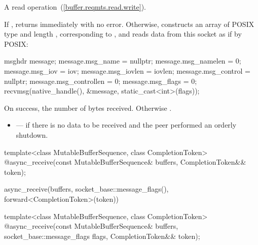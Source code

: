\begin{itemdescr}
\pnum
A read operation~(\ref{buffer.reqmts.read.write}).

\pnum
\effects If , returns immediately with no error. Otherwise, constructs an array  of POSIX type  and length , corresponding to , and reads data from this socket as if by POSIX:
\begin{codeblock}
msghdr message;
message.msg_name = nullptr;
message.msg_namelen = 0;
message.msg_iov = iov;
message.msg_iovlen = iovlen;
message.msg_control = nullptr;
message.msg_controllen = 0;
message.msg_flags = 0;
recvmsg(native_handle(), &message, static_cast<int>(flags));
\end{codeblock}


\pnum
\returns On success, the number of bytes received. Otherwise .

\pnum
\errors
\begin{itemize}
\item
{} --- if there is no data to be received and the peer performed an orderly shutdown.
\end{itemize}
\end{itemdescr}

\begin{itemdecl}
template<class MutableBufferSequence, class CompletionToken>
  @\DEDUCED@ async_receive(const MutableBufferSequence& buffers,
                        CompletionToken&& token);
\end{itemdecl}

\begin{itemdescr}
\pnum
\returns
\begin{codeblock}
async_receive(buffers, socket_base::message_flags(), forward<CompletionToken>(token))
\end{codeblock}
\end{itemdescr}

\begin{itemdecl}
template<class MutableBufferSequence, class CompletionToken>
  @\DEDUCED@ async_receive(const MutableBufferSequence& buffers,
                        socket_base::message_flags flags,
                        CompletionToken&& token);
\end{itemdecl}


